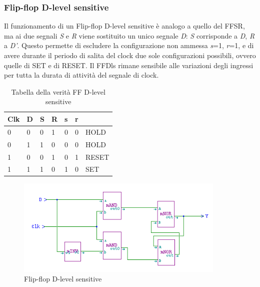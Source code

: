 \documentclass[10pt]{article}
\begin{document}
\begin{itemize}
\subsubsection{Flip-flop D-level sensitive}
Il funzionamento di un Flip-flop D-level sensitive è analogo a quello del FFSR, ma ai due segnali \emph{S} e \emph{R} viene sostituito un unico segnale \emph{D}: 
\emph{S} corrisponde a \emph{D}, \emph{R} a \emph{D'}. Questo permette di escludere la configurazione non ammessa \emph{s}=1, \emph{r}=1, 
e di avere durante il periodo di salita del clock due sole configurazioni possibili, ovvero quelle di SET e di RESET. 
Il FFDls rimane sensibile alle variazioni degli ingressi per tutta la durata di attività del segnale di clock.

\begin{table}[H]
    \begin{minipage}[b]{\textwidth}
    \centering
    \begin{tabular}{|ll|ll|ll|l|}
        \hline
        \textbf{Clk} & \textbf{D} & \textbf{S} & \textbf{R} & \textbf{s} & \textbf{r} &       \\ \hline
        0            & 0          & 0          & 1          & 0          & 0          & HOLD  \\ 
        0            & 1          & 1          & 0          & 0          & 0          & HOLD  \\ 
        1            & 0          & 0          & 1          & 0          & 1          & RESET \\ 
        1            & 1          & 1          & 0          & 1          & 0          & SET   \\ \hline
        \end{tabular}
        \caption{Tabella della verità FF D-level sensitive}
        \label{tab:my-table}
    \end{minipage}
    \end{table}
    
    \begin{figure}[H]
    \begin{minipage}[b]{\textwidth}
    \centering
    \includegraphics[width=100mm]{ffdls}
    \caption{Flip-flop D-level sensitive}
    \label{ }
    \end{minipage}
    \end{figure}



\end{itemize}
\end{document}
